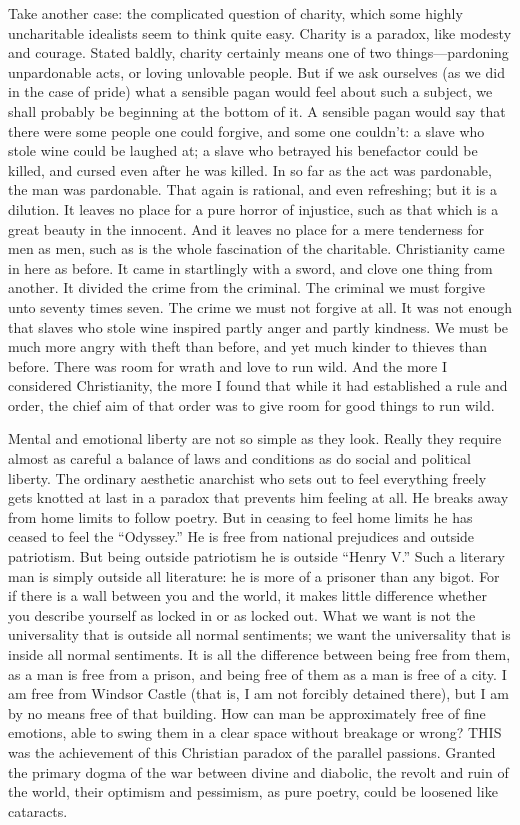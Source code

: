 Take another case: the complicated question of charity, which some highly uncharitable idealists seem to think quite easy. Charity is a paradox, like modesty and courage. Stated baldly, charity certainly means one of two things—pardoning unpardonable acts, or loving unlovable people. But if we ask ourselves (as we did in the case of pride) what a sensible pagan would feel about such a subject, we shall probably be beginning at the bottom of it. A sensible pagan would say that there were some people one could forgive, and some one couldn’t: a slave who stole wine could be laughed at; a slave who betrayed his benefactor could be killed, and cursed even after he was killed. In so far as the act was pardonable, the man was pardonable. That again is rational, and even refreshing; but it is a dilution. It leaves no place for a pure horror of injustice, such as that which is a great beauty in the innocent. And it leaves no place for a mere tenderness for men as men, such as is the whole fascination of the charitable. Christianity came in here as before. It came in startlingly with a sword, and clove one thing from another. It divided the crime from the criminal. The criminal we must forgive unto seventy times seven. The crime we must not forgive at all. It was not enough that slaves who stole wine inspired partly anger and partly kindness. We must be much more angry with theft than before, and yet much kinder to thieves than before. There was room for wrath and love to run wild. And the more I considered Christianity, the more I found that while it had established a rule and order, the chief aim of that order was to give room for good things to run wild.

Mental and emotional liberty are not so simple as they look. Really they require almost as careful a balance of laws and conditions as do social and political liberty. The ordinary aesthetic anarchist who sets out to feel everything freely gets knotted at last in a paradox that prevents him feeling at all. He breaks away from home limits to follow poetry. But in ceasing to feel home limits he has ceased to feel the “Odyssey.” He is free from national prejudices and outside patriotism. But being outside patriotism he is outside “Henry V.” Such a literary man is simply outside all literature: he is more of a prisoner than any bigot. For if there is a wall between you and the world, it makes little difference whether you describe yourself as locked in or as locked out. What we want is not the universality that is outside all normal sentiments; we want the universality that is inside all normal sentiments. It is all the difference between being free from them, as a man is free from a prison, and being free of them as a man is free of a city. I am free from Windsor Castle (that is, I am not forcibly detained there), but I am by no means free of that building. How can man be approximately free of fine emotions, able to swing them in a clear space without breakage or wrong? THIS was the achievement of this Christian paradox of the parallel passions. Granted the primary dogma of the war between divine and diabolic, the revolt and ruin of the world, their optimism and pessimism, as pure poetry, could be loosened like cataracts.

